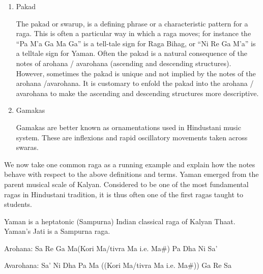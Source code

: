 \begin{enumerate}
  \par
  \item Pakad \par
  The pakad or swarup, is a defining phrase or a characteristic pattern for a raga.  This is often a particular way in which a raga moves; for instance the ``Pa M'a Ga Ma Ga'' is a tell-tale sign for Raga Bihag, or ``Ni Re Ga M'a'' is a telltale sign for Yaman.  Often the pakad is a natural consequence of the notes of arohana / avarohana (ascending and descending structures).  However, sometimes the pakad is unique and not implied by the notes of the arohana /avarohana.  It is customary to enfold the pakad into the arohana / avarohana to make the ascending and descending structures more descriptive.
  \par
  \item Gamakas \par 
  Gamakas are better known as ornamentations used in Hindustani music system. These are inflexions and rapid oscillatory movements taken across swaras.
\end{enumerate}
\par

We now take one common raga as a running example and explain how the notes behave with respect to the above definitions and terms. Yaman emerged from the parent musical scale of Kalyan. Considered to be one of the most fundamental ragas in Hindustani tradition, it is thus often one of the first ragas taught to students.
\par
Yaman is a heptatonic (Sampurna) Indian classical raga of Kalyan Thaat. Yaman's Jati is a Sampurna raga.
\par
Arohana: Sa Re Ga Ma(Kori Ma/tivra Ma i.e. Ma\#) Pa Dha Ni Sa'
\par
Avarohana: Sa' Ni Dha Pa Ma ((Kori Ma/tivra Ma i.e. Ma\#)) Ga Re Sa

